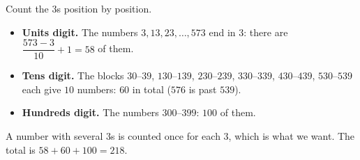 Count the $3$s position by position.
\begin{itemize}
\item \textbf{Units digit.} The numbers $3,13,23,\dots,573$ end in $3$: there are $\dfrac{573-3}{10}+1=58$ of them.
\item \textbf{Tens digit.} The blocks $30$--$39$, $130$--$139$, $230$--$239$, $330$--$339$, $430$--$439$, $530$--$539$ each give $10$ numbers: $60$ in total ($576$ is past $539$).
\item \textbf{Hundreds digit.} The numbers $300$--$399$: $100$ of them.
\end{itemize}
A number with several $3$s is counted once for each $3$, which is what we want. The total is $58+60+100=\boxed{218}$.
